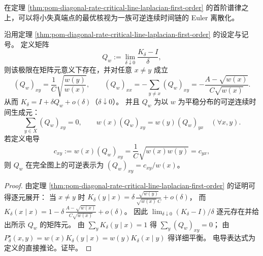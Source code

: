 在定理 \ref{thm:pom-diagonal-rate-critical-line-laplacian-first-order} 的首阶谱律之上，可以将小失真端点的最优核视为一族可逆连续时间链的 Euler 离散化。

\begin{corollary}[临界连续时间生成元与完全图电导]\label{cor:pom-diagonal-rate-critical-continuous-time-generator}
沿用定理 \ref{thm:pom-diagonal-rate-critical-line-laplacian-first-order} 的设定与记号。
定义矩阵
\[
Q_w:=\lim_{\delta\downarrow 0}\frac{K_\delta-I}{\delta},
\]
则该极限在矩阵元意义下存在，并对任意 \(x\ne y\) 成立
\[
(Q_w)_{xy}=\frac{1}{C}\sqrt{\frac{w(y)}{w(x)}},
\qquad
(Q_w)_{xx}=-\sum_{y\ne x}(Q_w)_{xy}
=-\frac{A-\sqrt{w(x)}}{C\sqrt{w(x)}}.
\]
从而 \(K_\delta=I+\delta Q_w+o(\delta)\)（\(\delta\downarrow 0\)）。
并且 \(Q_w\) 为以 \(w\) 为平稳分布的可逆连续时间生成元：
\[
\sum_{y\in X}(Q_w)_{xy}=0,\qquad
w(x)(Q_w)_{xy}=w(y)(Q_w)_{yx}\quad(\forall x,y).
\]
若定义电导
\[
c_{xy}:=w(x)(Q_w)_{xy}=\frac{1}{C}\sqrt{w(x)w(y)}=c_{yx},
\]
则 \(Q_w\) 在完全图上的可逆表示为 \((Q_w)_{xy}=c_{xy}/w(x)\)。
\end{corollary}
\begin{proof}
由定理 \ref{thm:pom-diagonal-rate-critical-line-laplacian-first-order} 的证明可得逐元展开：
当 \(x\ne y\) 时
\(
K_\delta(y\mid x)=\delta\,\frac{\sqrt{w(y)}}{\sqrt{w(x)}\,C}+o(\delta)
\)，
而
\(
K_\delta(x\mid x)=1-\delta\,\frac{A-\sqrt{w(x)}}{C\sqrt{w(x)}}+o(\delta)
\)。
因此 \(\lim_{\delta\downarrow 0}(K_\delta-I)/\delta\) 逐元存在并给出所示 \(Q_w\) 的矩阵元。
由 \(\sum_y K_\delta(y\mid x)=1\) 得 \(\sum_y (Q_w)_{xy}=0\)；
由 \(P^\star_\delta(x,y)=w(x)K_\delta(y\mid x)=w(y)K_\delta(x\mid y)\) 得详细平衡。
电导表达式为定义的直接推论。证毕。
\end{proof}

